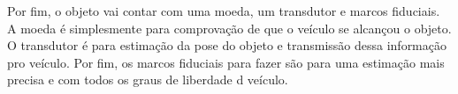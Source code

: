 Por fim, o objeto vai contar com uma moeda, um transdutor e marcos fiduciais. A moeda é simplesmente para comprovação de que o veículo se alcançou o objeto. O transdutor é para estimação da pose do objeto e transmissão dessa informação pro veículo. Por fim, os marcos fiduciais para fazer são para uma estimação mais precisa e com todos os graus de liberdade d veículo.

